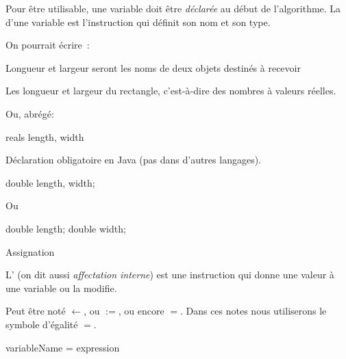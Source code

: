 \begin{hideedit}
\begin{frame}
  Pour être utilisable, une variable doit être \emph{déclarée} au
  début de l’algorithme. La 
  d’une variable est l’instruction qui définit son nom et son type.

  On pourrait écrire~:

  \begin{langagenaturel}
    Longueur et largeur seront les noms de deux 
    objets destinés à recevoir

    Les longueur et largeur du rectangle, 
    c’est-à-dire des nombres à valeurs réelles.

  \end{langagenaturel}

  Ou, abrégé:

  \begin{langagenaturel}
    reals length, width
  \end{langagenaturel}
\end{frame}

\begin{frame}[fragile]
  Déclaration obligatoire en Java (pas dans d'autres langages).

\begin{java}
double length, width;
\end{java}

Ou
\begin{java}
double length;
double width;
\end{java}
\end{frame}

\begin{frame}[fragile]{Assignation}
  \begin{definition}[Assignation]
    L’
    (on dit aussi \emph{affectation interne})
    est une instruction qui donne une valeur 
    à une variable ou la modifie.
  \end{definition}


  Peut être noté
  $\leftarrow$, ou $:=$, ou encore $=$.
  Dans ces notes nous utiliserons le symbole d'égalité $=$.

  \begin{langagenaturel}
variableName = expression
  \end{langagenaturel}


\end{frame}
\end{hideedit}
